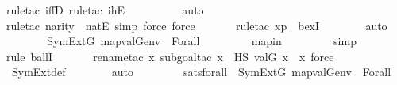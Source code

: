 \begin{isabellebody}
{\isacharparenleft}{\kern0pt}rule{\isacharunderscore}{\kern0pt}tac\ iffD{}{\isacharcomma}{\kern0pt}\ rule{\isacharunderscore}{\kern0pt}tac\ ihE{\isacharparenright}{\kern0pt}\isanewline
\ \ \ \ \ \ \ \ \isamarkupfalse%
\ auto{\isacharbrackleft}{\kern0pt}{}{\isacharbrackright}{\kern0pt}\isanewline
\ \ \ \ \ \ \ \isamarkupfalse%
{\isacharparenleft}{\kern0pt}rule{\isacharunderscore}{\kern0pt}tac\ n{\isacharequal}{\kern0pt}{\isachardoublequoteopen}arity{\isacharparenleft}{\kern0pt}{\isasymphi}{\isacharparenright}{\kern0pt}{\isachardoublequoteclose}\ \ natE{\isacharcomma}{\kern0pt}\ simp{\isacharcomma}{\kern0pt}\ force{\isacharcomma}{\kern0pt}\ force{\isacharparenright}{\kern0pt}\isanewline
\ \ \ \ \ \ \isamarkupfalse%
{\isacharparenleft}{\kern0pt}rule{\isacharunderscore}{\kern0pt}tac\ x{\isacharequal}{\kern0pt}p\ \ bexI{\isacharparenright}{\kern0pt}\isanewline
\ \ \ \ \ \ \isamarkupfalse%
\ auto\isanewline
\ \ \ \ \isamarkupfalse%
\ \isamarkupfalse%
\ {\isachardoublequoteopen}SymExt{\isacharparenleft}{\kern0pt}G{\isacharparenright}{\kern0pt}{\isacharcomma}{\kern0pt}\ map{\isacharparenleft}{\kern0pt}val{\isacharparenleft}{\kern0pt}G{\isacharparenright}{\kern0pt}{\isacharcomma}{\kern0pt}env{\isacharparenright}{\kern0pt}\ {\isasymTurnstile}\ Forall{\isacharparenleft}{\kern0pt}{\isasymphi}{\isacharparenright}{\kern0pt}{\isachardoublequoteclose}\ \isanewline
\ \ \ \ \ \ \isamarkupfalse%
\ mapin\ \isanewline
\ \ \ \ \ \ \isamarkupfalse%
\ simp\isanewline
\ \ \ \ \ \ \isamarkupfalse%
{\isacharparenleft}{\kern0pt}rule\ ballI{\isacharparenright}{\kern0pt}\isanewline
\ \ \ \ \ \ \isamarkupfalse%
{\isacharparenleft}{\kern0pt}rename{\isacharunderscore}{\kern0pt}tac\ x{\isacharcomma}{\kern0pt}\ subgoal{\isacharunderscore}{\kern0pt}tac\ {\isachardoublequoteopen}{\isasymexists}x{\isacharprime}{\kern0pt}\ {\isasymin}\ HS{\isachardot}{\kern0pt}\ val{\isacharparenleft}{\kern0pt}G{\isacharcomma}{\kern0pt}\ x{\isacharprime}{\kern0pt}{\isacharparenright}{\kern0pt}\ {\isacharequal}{\kern0pt}\ x{\isachardoublequoteclose}{\isacharcomma}{\kern0pt}\ force{\isacharparenright}{\kern0pt}\isanewline
\ \ \ \ \ \ \isamarkupfalse%
\ SymExt{\isacharunderscore}{\kern0pt}def\isanewline
\ \ \ \ \ \ \isamarkupfalse%
\ auto\isanewline
\ \ \isamarkupfalse%
\isanewline
\ \ \ \ \isamarkupfalse%
\ satsforall\ {\isacharcolon}{\kern0pt}\ {\isachardoublequoteopen}SymExt{\isacharparenleft}{\kern0pt}G{\isacharparenright}{\kern0pt}{\isacharcomma}{\kern0pt}\ map{\isacharparenleft}{\kern0pt}val{\isacharparenleft}{\kern0pt}G{\isacharparenright}{\kern0pt}{\isacharcomma}{\kern0pt}env{\isacharparenright}{\kern0pt}\ {\isasymTurnstile}\ Forall{\isacharparenleft}{\kern0pt}{\isasymphi}{\isacharparenright}{\kern0pt}{\isachardoublequoteclose}\isanewline

\end{isabellebody}
